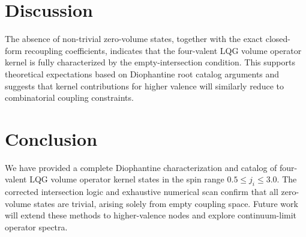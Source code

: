 \documentclass[11pt]{article}
\begin{document}
\section{Discussion}
The absence of non-trivial zero-volume states, together with the exact closed-form recoupling coefficients, indicates that the four-valent LQG volume operator kernel is fully characterized by the empty-intersection condition. This supports theoretical expectations based on Diophantine root catalog arguments and suggests that kernel contributions for higher valence will similarly reduce to combinatorial coupling constraints.

\section{Conclusion}
We have provided a complete Diophantine characterization and catalog of four-valent LQG volume operator kernel states in the spin range $0.5\le j_i\le3.0$. The corrected intersection logic and exhaustive numerical scan confirm that all zero-volume states are trivial, arising solely from empty coupling space. Future work will extend these methods to higher-valence nodes and explore continuum-limit operator spectra.



\end{document}
